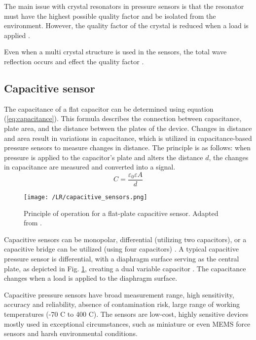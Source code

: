 The main issue with crystal resonators in pressure sensors is that the resonator must have the highest possible quality factor and be isolated from the environment. 
However, the quality factor of the crystal is reduced when a load is applied \cite{handbook_sensors}.

Even when a multi crystal structure is used in the sensors, the total wave reflection occurs and effect the quality factor \cite{handbook_sensors}.


\subsection{Capacitive sensor}

The capacitance of a flat capacitor can be determined using equation (\ref{eq:capacitance}). 
This formula describes the connection between capacitance, plate area, and the distance between the plates of the device. 
Changes in distance and area result in variations in capacitance, which is utilized in capacitance-based pressure sensors to measure changes in distance.
The principle is as follows: when pressure is applied to the capacitor's plate and alters the distance $d$, the changes in capacitance are measured and converted into a signal.
\begin{equation}
    \label{eq:capacitance}
    C = \frac{\varepsilon_0 \varepsilon A}{d}
\end{equation}

\begin{figure}[t]
    \centering
    \texttt{[image: /LR/capacitive\_sensors.png]}
    \caption{Principle of operation for a flat-plate capacitive sensor. Adapted from \cite[Fig. 7.6]{handbook_sensors}.}
    \label{fig:capacitive_sensors}
\end{figure}

Capacitive sensors can be monopolar, differential (utilizing two capacitors), or a capacitive bridge can be utilized (using four capacitors) \cite{handbook_sensors}.
A typical capacitive pressure sensor is differential, with a diaphragm surface serving as the central plate, as depicted in 
Fig. \ref{fig:capacitive_sensors}, creating a dual variable capacitor \cite{pressure_sens_calibration_stat_dyn}.
The capacitance changes when a load is applied to the diaphragm surface. 

Capacitive pressure sensors have broad measurement range, high sensitivity, accuracy and reliability, absence of contamination risk, 
large range of working temperatures (-70 \textdegree C to 400 \textdegree C).
The sensors are low-cost, highly sensitive devices mostly used in exceptional circumstances, such as miniature or even 
MEMS force sensors \cite{multi_axis_force_sensors_review} and harsh environmental conditions.

